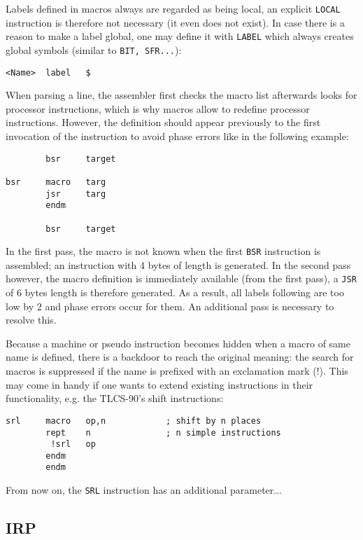 \documentclass[12pt,twoside]{report}
\makeatletter
\newcommand{\tty}[1]{{\tt #1}}
\newcommand{\ttindex}[1]{\index{#1@{\tt #1}}}
\makeatother
\begin{document}
Labels defined in macros always are regarded as being local, an explicit
\tty{LOCAL} instruction is therefore not necessary (it even does not
exist).  In case there is a reason to make a label global, one may define
it with \tty{LABEL} which always creates global symbols (similar to \tty{BIT,
SFR...}):
\begin{verbatim}
<Name>  label   $
\end{verbatim}
When parsing a line, the assembler first checks the macro list
afterwards looks for processor instructions, which is why macros
allow to redefine processor instructions.  However, the definition
should appear previously to the first invocation of the instruction
to avoid phase errors like in the following example:
\begin{verbatim}
        bsr     target

bsr     macro   targ
        jsr     targ
        endm

        bsr     target
\end{verbatim}
In the first pass, the macro is not known when the first \tty{BSR}
instruction is assembled; an instruction with 4 bytes of length is
generated.  In the second pass however, the macro definition is
immediately available (from the first pass), a \tty{JSR} of 6 bytes length
is therefore generated.  As a result, all labels following are too low
by 2 and phase errors occur for them.  An additional pass is
necessary to resolve this.

Because a machine or pseudo instruction becomes hidden when a macro
of same name is defined, there is a backdoor to reach the original
meaning: the search for macros is suppressed if the name is prefixed
with an exclamation mark (!).  This may come in handy if one wants to
extend existing instructions in their functionality, e.g. the
TLCS-90's shift instructions:
\begin{verbatim}
srl     macro   op,n            ; shift by n places
        rept    n               ; n simple instructions   
         !srl   op
        endm
        endm
\end{verbatim}
From now on, the \tty{SRL} instruction has an additional parameter...


\subsection{IRP}
\ttindex{IRP}
\end{document}
